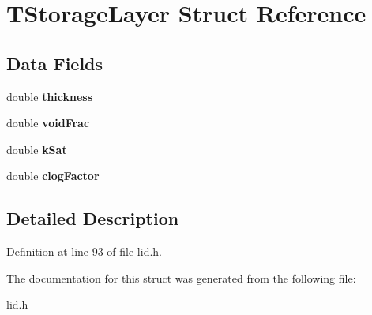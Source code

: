 \hypertarget{struct_t_storage_layer}{}\section{T\+Storage\+Layer Struct Reference}
\label{struct_t_storage_layer}
\subsection*{Data Fields}
\begin{DoxyCompactItemize}
\item 
\mbox{\label{struct_t_storage_layer_a20238819f2c84ce6d3f083ded9ac612d}} 
double {\bfseries thickness}
\item 
\mbox{\label{struct_t_storage_layer_a7d25974d9e4546293ba18fee0f29620f}} 
double {\bfseries void\+Frac}
\item 
\mbox{\label{struct_t_storage_layer_a8e493f06916cda5a3fc90418c0b6b3f6}} 
double {\bfseries k\+Sat}
\item 
\mbox{\label{struct_t_storage_layer_abbad23abbcd30f0821d89dc3093879bb}} 
double {\bfseries clog\+Factor}
\end{DoxyCompactItemize}


\subsection{Detailed Description}


Definition at line 93 of file lid.\+h.



The documentation for this struct was generated from the following file\+:\begin{DoxyCompactItemize}
\item 
lid.\+h\end{DoxyCompactItemize}
